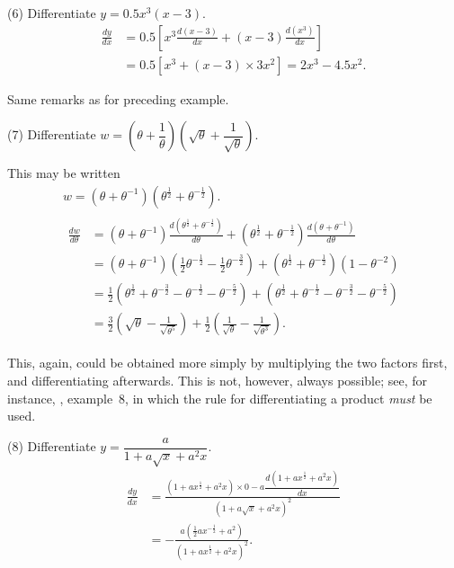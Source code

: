 \documentclass[12pt]{book}[2005/09/16]
\newcommand{\DPPageSep}[2]{\Pagelabel{#2}}
\newcommand{\Pagelabel}[1]
  {\phantomsection\label{#1}}
\newcommand{\Pageref}[2][p.]{%
  \ifthenelse{\not\equal{#1}{}}{%
    \hyperref[#2]{#1~\pageref*{#2}}%
  }{%
    \hyperref[#2]{\pageref{*#2}}%
  }%
}
\newcommand{\efrac}[2]{\frac{#1}{#2}}
\begin{document}
(6) Differentiate $y = 0.5 x^3(x-3)$.
\begin{align*}
\frac{dy}{dx}
  &= 0.5\left[x^3 \frac{d(x-3)}{dx} + (x-3) \frac{d(x^3)}{dx}\right] \\
  &= 0.5\left[x^3 + (x-3) × 3x^2\right] = 2x^3 - 4.5x^2.
\end{align*}

Same remarks as for preceding example.

(7) Differentiate $w = \left(\theta + \dfrac{1}{\theta}\right)
   \left(\sqrt{\theta} + \dfrac{1}{\sqrt{\theta}}\right)$.

This may be written
\begin{gather*}
w = (\theta + \theta^{-1})(\theta^{\efrac{1}{2}} + \theta^{-\efrac{1}{2}}). \\
\begin{aligned}
\frac{dw}{d\theta}
  &= (\theta + \theta^{-1})
     \frac{d(\theta^{\efrac{1}{2}} + \theta^{-\efrac{1}{2}})}{d\theta}
   + (\theta^{\efrac{1}{2}} + \theta^{-\efrac{1}{2}})
     \frac{d(\theta+\theta^{-1})}{d\theta} \\
%
  &= (\theta + \theta^{-1})(\tfrac{1}{2}\theta^{-\efrac{1}{2}}
                          - \tfrac{1}{2}\theta^{-\efrac{3}{2}})
   + (\theta^{\efrac{1}{2}} + \theta^{-\efrac{1}{2}})(1 - \theta^{-2}) \\
%
  &= \tfrac{1}{2}(\theta^{ \efrac{1}{2}} + \theta^{-\efrac{3}{2}}
                - \theta^{-\efrac{1}{2}} - \theta^{-\efrac{5}{2}})
   + (\theta^{ \efrac{1}{2}} + \theta^{-\efrac{1}{2}}
    - \theta^{-\efrac{3}{2}} - \theta^{-\efrac{5}{2}}) \\%
%
  &= \tfrac{3}{2} \left(\sqrt{\theta} - \frac{1}{\sqrt{\theta^5}}\right)
   + \tfrac{1}{2} \left(\frac{1}{\sqrt{\theta}} - \frac{1}{\sqrt{\theta^3}}\right).
\end{aligned}
\end{gather*}

This, again, could be obtained more simply by
multiplying the two factors first, and differentiating
afterwards. This is not, however, always possible;
see, for instance, \Pageref{example1}, example~8, in which the %
rule for differentiating a product \emph{must} be used.

(8) Differentiate $y =\dfrac{a}{1 + a\sqrt{x} + a^2x}$.
\begin{align*}
\frac{dy}{dx}
  &= \frac{(1 + ax^{\efrac{1}{2}} + a^2x) × 0 - a\dfrac{d(1 + ax^{\efrac{1}{2}} + a^2x)}{dx}}
          {(1 + a\sqrt{x} + a^2x)^2} \\
  &= - \frac{a(\frac{1}{2}ax^{-\efrac{1}{2}} + a^2)}
            {(1 + ax^{\efrac{1}{2}} + a^2x)^2}.
\end{align*}
\DPPageSep{056.png}{44}%
\end{document}

